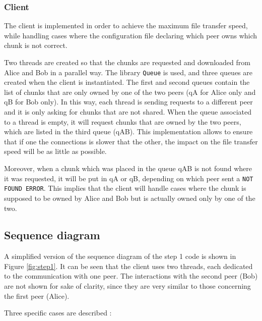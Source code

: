 \subsubsection{Client}

The client is implemented in order to achieve the maximum file transfer speed, while handling cases where the configuration file declaring which peer owns which chunk is not correct.

Two threads are created so that the chunks are requested and downloaded from Alice and Bob in a parallel way. The library \texttt{Queue} is used, and three queues are created when the client is instantiated. The first and second queues contain the list of chunks that are only owned by one of the two peers (qA for Alice only and qB for Bob only). In this way, each thread is sending requests to a different peer and it is only asking for chunks that are not shared. When the queue associated to a thread is empty, it will request chunks that are owned by the two peers, which are listed in the third queue (qAB). This implementation allows to ensure that if one the connections is slower that the other, the impact on the file transfer speed will be as little as possible.

Moreover, when a chunk which was placed in the queue qAB is not found where it was requested, it will be put in qA or qB, depending on which peer sent a \texttt{NOT FOUND ERROR}. This implies that the client will handle cases where the chunk is supposed to be owned by Alice and Bob but is actually owned only by one of the two.

\subsection{Sequence diagram}

A simplified version of the sequence diagram of the step 1 code is shown in Figure \ref{fig:step1}. It can be seen that the client uses two threads, each dedicated to the communication with one peer. The interactions with the second peer (Bob) are not shown for sake of clarity, since they are very similar to those concerning the first peer (Alice).

Three specific cases are described : 

